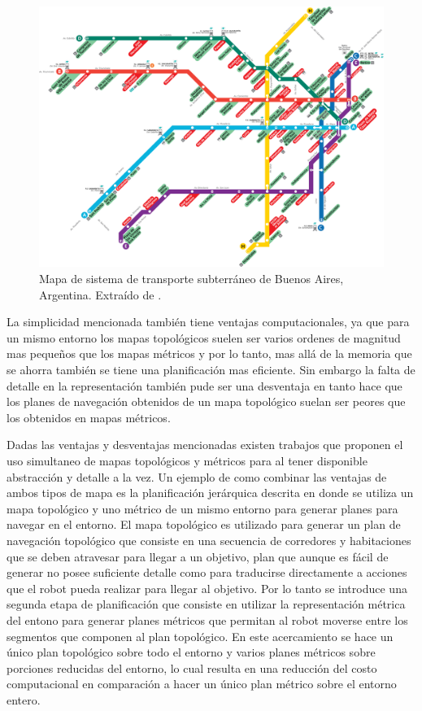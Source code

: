 \begin{figure}[H]
  \center
  \includegraphics[width=1\linewidth]{imagenes/metroBsAs.png}
  \caption{Mapa de sistema de transporte subterráneo de Buenos Aires, Argentina. Extraído de \cite{metroBsAs}.}\label{fig:metroBsAs}
\end{figure} 

La simplicidad mencionada también tiene ventajas computacionales,  ya que para un mismo entorno los mapas topológicos suelen ser varios ordenes de magnitud mas pequeños que los mapas métricos y por lo tanto, mas allá de la memoria que se ahorra también se tiene una planificación mas eficiente. Sin embargo la falta de detalle en la representación también pude ser una desventaja en tanto hace que los planes de navegación obtenidos de un mapa topológico suelan ser peores que los obtenidos en mapas métricos.

Dadas las ventajas y desventajas mencionadas existen trabajos \cite{Thrun1998,wurm2008coordinated,Liu2015} que proponen el uso simultaneo de mapas topológicos y métricos para  al tener disponible abstracción y detalle a la vez. Un ejemplo de como combinar las ventajas de ambos tipos de mapa es la planificación jerárquica descrita en \cite{Thrun1998} donde se utiliza un mapa topológico y uno métrico de un mismo entorno para generar planes para navegar en el entorno. El mapa topológico es utilizado para generar un plan de navegación topológico que consiste en una secuencia de corredores y habitaciones que se deben atravesar para llegar a un objetivo, plan que aunque es fácil de generar no posee suficiente detalle como para traducirse directamente a acciones que el robot pueda realizar para llegar al objetivo. Por lo tanto se introduce una segunda etapa de planificación que consiste en utilizar la representación métrica del entono para generar planes métricos que permitan al robot moverse entre los segmentos que componen al plan topológico. En este acercamiento se hace un único plan topológico sobre todo el entorno y varios planes métricos sobre porciones reducidas del entorno, lo cual resulta en una reducción del costo computacional en comparación a hacer un único plan métrico sobre el entorno entero.

